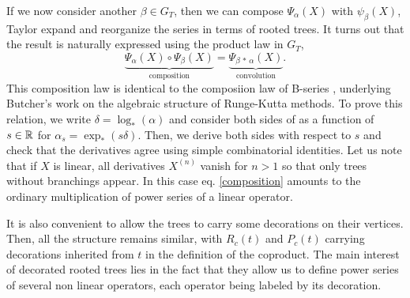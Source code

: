 \documentclass[10pt,here,feynmf]{article}
\begin{document}
If we now consider another $\beta\in G_{T}$, then we can compose $\Psi_{\alpha}(X)$ with $\psi_{\beta}(X)$, Taylor expand and reorganize the series in terms of rooted  trees. It turns out that the result is naturally expressed using the product law in $G_{T}$,
\begin{equation}
\underbrace{\Psi_{\alpha}(X)\circ\Psi_{\beta}(X)}_{\mathrm{composition}}=
\underbrace{\Psi_{\beta\,\ast\,\alpha}(X)}_{\mathrm{convolution}}.
\label{composition}
\end{equation}
This composition law is identical to the composiion law of B-series \cite{wanner},
underlying Butcher's work on the algebraic structure of Runge-Kutta methods. To prove this relation, we write $\delta=\log_{\ast}(\alpha)$ and consider both sides of as a function of $s\in{\Bbb R}$ for $\alpha_{s}=\exp_{\ast}(s\delta)$. Then, we derive both sides with respect to $s$ and check that the derivatives agree using simple combinatorial identities. Let us note  that if $X$ is linear, all derivatives $X^{(n)}$ vanish for $n>1$ so that only trees without branchings appear. In this case eq. \eqref{composition} amounts to the ordinary multiplication of power series of a linear operator. 


It is also convenient to allow the trees to carry some decorations on their vertices. Then, all the structure remains similar, with $R_{c}(t)$ and $P_{c}(t)$ carrying decorations inherited from $t$ in the definition of the coproduct. The main interest of decorated rooted trees lies in the fact that they allow us to define power series of several non linear operators, each operator being labeled by its decoration.
\end{document}
